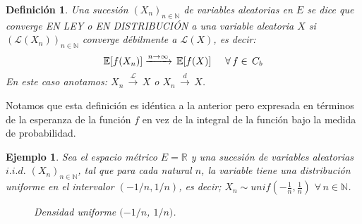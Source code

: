 \documentclass[a4paper]{article}
\newtheorem{definicion}{Definición}
\newtheorem{ejemplo}{Ejemplo}
\numberwithin{equation}{subsection}
\def\R{\mathbb R}
\def\N{\mathbb N}
\def\E{\mathbb E}
\begin{document}
\begin{definicion} Una sucesión $(X_n)_{n\in\N}$ de variables aleatorias en $E$ se dice que converge EN LEY o EN DISTRIBUCIÓN a una variable aleatoria $X$ si $(\mathcal{L}(X_n))_{n\in\N}$ converge débilmente a $\mathcal{L}(X)$, es decir:
\[\E[f(X_n)] \xrightarrow{n\rightarrow\infty}\,\E[f(X)]\hspace{0.5cm}\forall\,f\in\,C_b\]
En este caso anotamos: $X_n\,\xrightarrow{\mathcal{L}}\,X$ o $X_n\,\xrightarrow{d}\,X$.
\end{definicion}
Notamos que esta definición es idéntica a la anterior pero expresada en términos de la esperanza de la función $f$ en vez de la integral de la función bajo la medida de probabilidad.
\newpage
\begin{ejemplo} Sea el espacio métrico $E=\R$ y una sucesión de variables aleatorias $i.i.d.$ $(X_n)_{n\in\N}$, tal que para cada natural $n$, la variable tiene una distribución uniforme en el intervalor $(-1/n, 1/n)$, es decir; $X_n \sim unif(-\frac{1}{n},\frac{1}{n})$ $\forall\,n\in\N$.
\begin{figure}
\centering
    \caption{Densidad uniforme $(-1/n$, $1/n)$.}
\end{figure}


\end{ejemplo}
\end{document}
